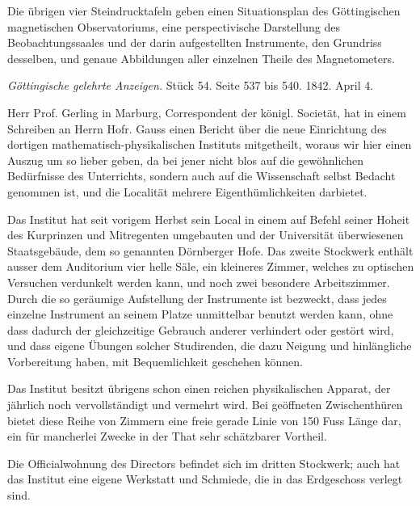 \documentclass[fontsize=10pt,paper=a5,pagesize=auto]{scrbook}
\newcommand{\origpage}[1]{\marginpar{\footnotesize\textit{S. #1}}}
\begin{document}
Die übrigen vier Steindrucktafeln geben einen Situationsplan des Göttingischen magnetischen Observatoriums, eine perspectivische Darstellung des Beobachtungssaales und der darin aufgestellten Instrumente, den Grundriss desselben, und genaue Abbildungen aller einzelnen Theile des Magnetometers.

\origpage{597}
\begin{otherlanguage}{ngerman}
\textit{Göttingische gelehrte Anzeigen.} Stück 54. Seite 537 bis 540. 1842. April 4.
\end{otherlanguage}

Herr Prof. Gerling in Marburg, Correspondent der königl. Societät, hat in einem Schreiben an Herrn Hofr. Gauss einen Bericht über die neue Einrichtung des dortigen mathematisch-physikalischen Instituts mitgetheilt, woraus wir hier einen Auszug um so lieber geben, da bei jener nicht blos auf die gewöhnlichen Bedürfnisse des Unterrichts, sondern auch auf die Wissenschaft selbst Bedacht genommen ist, und die Localität mehrere Eigenthümlichkeiten darbietet.

Das Institut hat seit vorigem Herbst sein Local in einem auf Befehl seiner Hoheit des Kurprinzen und Mitregenten umgebauten und der Universität überwiesenen Staatsgebäude, dem so genannten Dörnberger Hofe. Das zweite Stockwerk enthält ausser dem Auditorium vier helle Säle, ein kleineres Zimmer, welches zu optischen Versuchen verdunkelt werden kann, und noch zwei besondere Arbeitszimmer. Durch die so geräumige Aufstellung der Instrumente ist bezweckt, dass jedes einzelne Instrument an seinem Platze unmittelbar benutzt werden kann, ohne dass dadurch der gleichzeitige Gebrauch anderer verhindert oder gestört wird, und dass eigene Übungen solcher Studirenden, die dazu Neigung und hinlängliche Vorbereitung haben, mit Bequemlichkeit geschehen können.

\origpage{598}
Das Institut besitzt übrigens schon einen reichen physikalischen Apparat, der jährlich noch vervollständigt und vermehrt wird. Bei geöffneten Zwischenthüren bietet diese Reihe von Zimmern eine freie gerade Linie von 150 Fuss Länge dar, ein für mancherlei Zwecke in der That sehr schätzbarer Vortheil.

Die Officialwohnung des Directors befindet sich im dritten Stockwerk; auch hat das Institut eine eigene Werkstatt und Schmiede, die in das Erdgeschoss verlegt sind.
\end{document}

